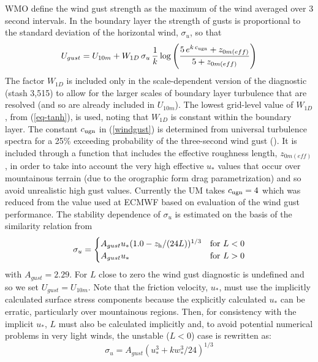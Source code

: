 \documentclass{UMDP_article}
\begin{document}
WMO define the wind gust strength as the maximum of the wind averaged
over 3 second intervals.  In the boundary layer the strength of gusts
is proportional to the standard deviation of the horizontal wind,
$\sigma_u$, so that
\begin{equation}
  U_{gust} = U_{10m} + W_{1D} \, \sigma_u \,  \frac{1}{k} \,  
  {\rm log}\left( \frac{5 \, e^{k \, c_{\rm ugn}} + z_{0m(eff)} }   
    {5 + z_{0m(eff)}} \right)
\label{windgust}
\end{equation}
The factor $W_{1D}$ is included only in the scale-dependent version of 
the diagnostic (stash 3,515) to allow for the larger scales of boundary 
layer turbulence that are resolved (and so are already included in 
$U_{10m}$).  The lowest grid-level value of $W_{1D}$, from (\ref{eq-tanh}), 
is used, noting that $W_{1D}$ is constant within the boundary layer.  The 
constant $c_{\rm ugn}$ in (\ref{windgust}) is determined from universal 
turbulence spectra for a 25\% exceeding probability of the three-second 
wind gust (\cite{beljaars1987}).  It is included through a function that
includes the effective roughness length, $z_{0m(eff)}$, in order to
take into account the very high effective $u_*$ values that occur over
mountainous terrain (due to the orographic form drag parametrization)
and so avoid unrealistic high gust values.  Currently the UM takes
$c_{\rm ugn}=4$ which was reduced from the value used at ECMWF based
on evaluation of the wind gust performance.  The stability dependence
of $\sigma_u$ is estimated on the basis of the similarity relation
from \cite{panofsky1977}
\begin{equation*}
  \sigma_u =
\begin{cases}
  A_{gust} u_*  (1.0 - z_{\rm h} / (24 L) )^{1/3} & {\rm for}\ L<0 \\
  A_{gust} u_* & {\rm for}\ L>0
\end{cases}
\end{equation*}
with $A_{gust}=2.29$.  For $L$ close to zero the wind gust diagnostic
is undefined and so we set $U_{gust} = U_{10m}$.  Note that the
friction velocity, $u_*$, must use the implicitly calculated surface
stress components because the explicitly calculated $u_*$ can be
erratic, particularly over mountainous regions.  Then, for consistency 
with the implicit $u_*$, $L$ must also be calculated implicitly and, to 
avoid potential numerical problems in very light winds, the unstable 
($L<0$) case is rewritten as:
\begin{equation*}
 \sigma_u = A_{gust} (u_*^3 + k w_*^3 / 24 )^{1/3}
\end{equation*}
\end{document}
